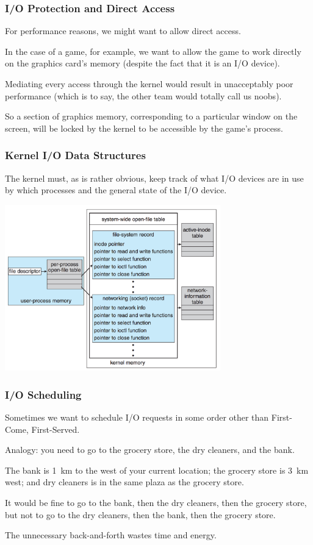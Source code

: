 \begin{frame}
\frametitle{I/O Protection and Direct Access}

For performance reasons, we might want to allow direct access. 

In the case of a game, for example, we want to allow the game to work directly on the graphics card's memory (despite the fact that it is an I/O device). 

Mediating every access through the kernel would result in unacceptably poor performance (which is to say, the other team would totally call us noobs). 

So a section of graphics memory, corresponding to a particular window on the screen, will be locked by the kernel to be accessible by the game's process.


\end{frame}

\begin{frame}
\frametitle{Kernel I/O Data Structures}
The kernel must, as is rather obvious, keep track of what I/O devices are in use by which processes and the general state of the I/O device.

\begin{center}
	\includegraphics[width=0.7\textwidth]{images/unix-io-kernel.png}
\end{center}


\end{frame}

\begin{frame}
\frametitle{I/O Scheduling}

Sometimes we want to schedule I/O requests in some order other than First-Come, First-Served. 

Analogy: you need to go to the grocery store, the dry cleaners, and the bank. 

The bank is 1~km to the west of your current location; the grocery store is 3~km west; and dry cleaners is in the same plaza as the grocery store. 

It would be fine to go to the bank, then the dry cleaners, then the grocery store, but not to go to the dry cleaners, then the bank, then the grocery store. 

The unnecessary back-and-forth wastes time and energy.


\end{frame}

